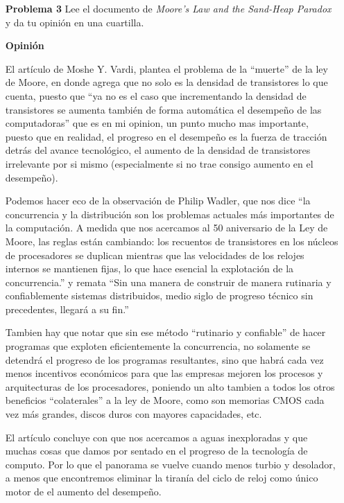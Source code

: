 \documentclass{article}
\begin{document}
\begin{enumerate}
\begin{itemize}
\end{itemize}


\item[\bf{Problema 3}]Lee el documento de {\it Moore’s Law and the Sand-Heap Paradox} y da tu opinión en una cuartilla.

\item[\bf{Opinión}]

El artículo de Moshe Y. Vardi, plantea el problema de la ``muerte'' de la ley de Moore, en donde agrega que no solo es la densidad de transistores lo que cuenta, puesto que ``ya no es el caso que incrementando la densidad de transistores se aumenta también de forma automática el desempeño de las computadoras'' que es en mi opinion, un punto mucho mas importante, puesto que en realidad, el progreso en el desempeño es la fuerza de tracción detrás del avance tecnológico, el aumento de la densidad de transistores irrelevante por si mismo (especialmente si no trae consigo aumento en el desempeño).

Podemos hacer eco de la observación de Philip Wadler, que nos dice ``la concurrencia y la distribución son los problemas actuales más importantes de la computación. A medida que nos acercamos al 50 aniversario de la Ley de Moore, las reglas están cambiando: los recuentos de transistores en los núcleos de procesadores se duplican mientras que las velocidades de los relojes internos se mantienen fijas, lo que hace esencial la explotación de la concurrencia.'' y remata ``Sin una manera de construir de manera rutinaria y confiablemente sistemas distribuidos, medio siglo de progreso técnico sin precedentes, llegará a su fin.''

Tambien hay que notar que sin ese método ``rutinario y confiable'' de hacer programas que exploten eficientemente la concurrencia, no solamente se detendrá el progreso de los programas resultantes, sino que habrá cada vez menos incentivos económicos para que las empresas mejoren los procesos y arquitecturas de los procesadores, poniendo un alto tambien a todos los otros beneficios ``colaterales'' a la ley de Moore, como son memorias CMOS cada vez más grandes, discos duros con mayores capacidades, etc.

El artículo concluye con que nos acercamos a aguas inexploradas y que muchas cosas que damos por sentado en el progreso de la tecnología de computo. Por lo que el panorama se vuelve cuando menos turbio y desolador, a menos que encontremos eliminar la tiranía del ciclo de reloj como único motor de el aumento del desempeño.

\end{enumerate}
\end{document}
